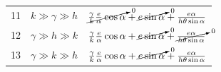 \documentclass[12pt]{article}
\begin{document}
\begin{table}[ht!]
\begin{tabular}{@{}llr@{}}
11       & $k\gg\gamma\gg h$         & $\cancelto{0}{\tfrac{\gamma}{k}\tfrac{e}{\alpha}\cos\alpha} + \cancelto{0}{e\sin\alpha} + \tfrac{e\alpha}{h\theta\sin\alpha}$ \\
12       & $\gamma\gg h\gg k$        & $\tfrac{\gamma}{k}\tfrac{e}{\alpha}\cos\alpha + \cancelto{0}{e\sin\alpha} + \cancelto{0}{\tfrac{e\alpha}{h\theta\sin\alpha}}$ \\
13       & $\gamma\gg k\gg h$        & $\tfrac{\gamma}{k}\tfrac{e}{\alpha}\cos\alpha + \cancelto{0}{e\sin\alpha} + \tfrac{e\alpha}{h\theta\sin\alpha}$ \\ \bottomrule
\end{tabular}
\label{tab:gainsLinAngVelRelation}
\end{table}
\end{document}
